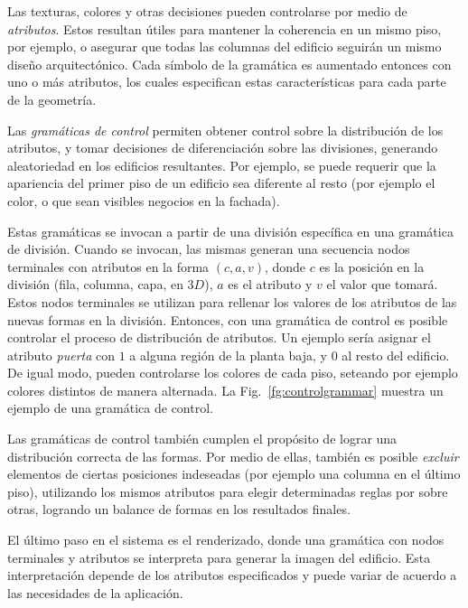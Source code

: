 Las texturas, colores y otras decisiones pueden controlarse por medio de {\em atributos}.
Estos resultan útiles para mantener la coherencia en un mismo piso, por ejemplo, o asegurar que todas las columnas del edificio seguirán un mismo diseño arquitectónico.
Cada símbolo de la gramática es aumentado entonces con uno o más atributos, los cuales especifican estas características para cada parte de la geometría.


Las {\em gramáticas de control} permiten obtener control sobre la distribución de los atributos, y tomar decisiones de diferenciación sobre las divisiones, generando aleatoriedad en los edificios resultantes.
Por ejemplo, se puede requerir que la apariencia del primer piso de un edificio sea diferente al resto (por ejemplo el color, o que sean visibles negocios en la fachada).

Estas gramáticas se invocan a partir de una división específica en una gramática de división.
Cuando se invocan, las mismas generan una secuencia nodos terminales con atributos en la forma $(c,a,v)$, donde $c$ es la posición en la división (fila, columna, capa, en $3D$), $a$ es el atributo y $v$ el valor que tomará.
Estos nodos terminales se utilizan para rellenar los valores de los atributos de las nuevas formas en la división.
Entonces, con una gramática de control es posible controlar el proceso de distribución de atributos.
Un ejemplo sería asignar el atributo {\em puerta} con $1$ a alguna región de la planta baja, y $0$ al resto del edificio.
De igual modo, pueden controlarse los colores de cada piso, seteando por ejemplo colores distintos de manera alternada.
La Fig.~\ref{fg:controlgrammar} muestra un ejemplo de una gramática de control.


Las gramáticas de control también cumplen el propósito de lograr una distribución correcta de las formas.
Por medio de ellas, también es posible {\em excluir} elementos de ciertas posiciones indeseadas (por ejemplo una columna en el último piso), utilizando los mismos atributos para elegir determinadas reglas por sobre otras, logrando un balance de formas en los resultados finales.

El último paso en el sistema es el renderizado, donde una gramática con nodos terminales y atributos se interpreta para generar la imagen del edificio.
Esta interpretación depende de los atributos especificados y puede variar de acuerdo a las necesidades de la aplicación.

